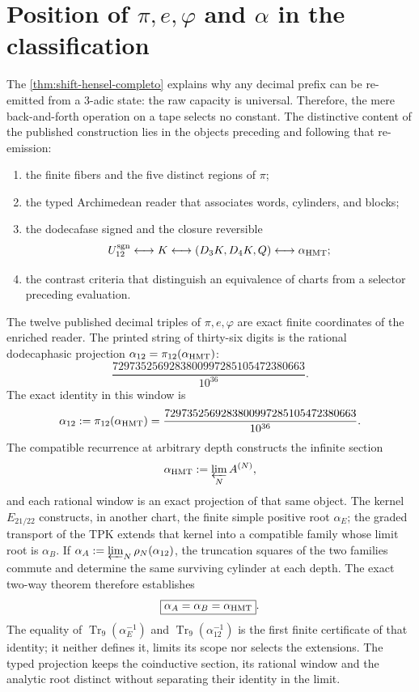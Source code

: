 \section{Position of \texorpdfstring{\(\pi,e,\varphi\) and \(\alpha\)}{pi, e, phi, and alpha} in the classification}

The \cref{thm:shift-hensel-completo} explains why any decimal prefix
can be re-emitted from a 3-adic state: the raw capacity is
universal. Therefore, the mere back-and-forth operation on a tape selects no
constant. The distinctive content of the published construction lies
in the objects preceding and following that re-emission:
\begin{enumerate}
\item the finite fibers and the five distinct regions of \(\pi\);
\item the typed Archimedean reader that associates words, cylinders, and blocks;
\item the dodecafase signed and the closure reversible
\[
U_{12}^{\rm sgn}
\longleftrightarrow K
\longleftrightarrow(D_3K,D_4K,Q)
\longleftrightarrow\alpha_{\rm HMT};
\]
\item the contrast criteria that distinguish an equivalence of charts
from a selector preceding evaluation.
\end{enumerate}

The twelve published decimal triples of \(\pi,e,\varphi\) are exact finite
coordinates of the enriched reader. The printed string of thirty-six
digits is the rational dodecaphasic projection
\(\alpha_{12}=\pi_{12}(\alpha_{\rm HMT})\):
\[
\frac{7297352569283800997285105472380663}{10^{36}}.
\]
The exact identity in this window is
\[
\alpha_{12}
:=\pi_{12}(\alpha_{\rm HMT})
=\frac{7297352569283800997285105472380663}{10^{36}}.
\]
The compatible recurrence at arbitrary depth constructs the infinite
section
\[
 \alpha_{\rm HMT}:=\varprojlim_N A^{(N)},
\]
and each rational window is an exact projection of that same object. The
kernel \(E_{21/22}\) constructs, in another chart, the finite simple positive
root \(\alpha_E\); the graded transport of the TPK extends that kernel into
a compatible family whose limit root is \(\alpha_B\). If
\(\alpha_A:=\varprojlim_N\rho_N(\alpha_{12})\), the truncation squares
of the two families commute and determine the same surviving
cylinder at each depth. The exact two-way theorem therefore establishes
\[
 \boxed{\alpha_A=\alpha_B=\alpha_{\rm HMT}}.
\]
The equality of \(\operatorname{Tr}_9(\alpha_E^{-1})\) and
\(\operatorname{Tr}_9(\alpha_{12}^{-1})\) is the first finite certificate of
that identity; it neither defines it, limits its scope nor selects the
extensions. The typed projection keeps the coinductive
section, its rational window and the analytic root distinct without separating their identity
in the limit.

